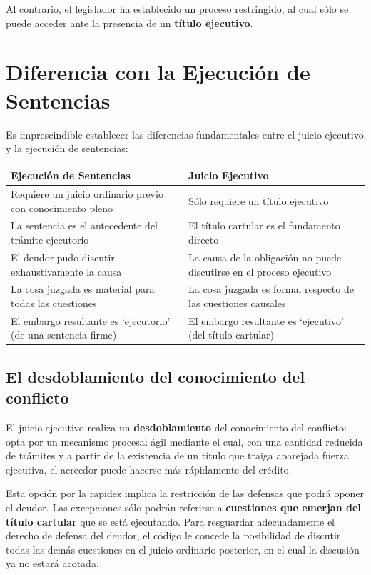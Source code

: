 \documentclass[12pt,oneside]{book}
\begin{document}
Al contrario, el legislador ha establecido un proceso restringido, al cual sólo se puede acceder ante la presencia de un \textbf{título ejecutivo}.

\section{Diferencia con la Ejecución de Sentencias}

Es imprescindible establecer las diferencias fundamentales entre el juicio ejecutivo y la ejecución de sentencias:

\begin{table}[H]
\centering
\begin{tabularx}{\textwidth}{Xp{5cm}}
\toprule
\textbf{Ejecución de Sentencias} & \textbf{Juicio Ejecutivo} \\
\midrule
Requiere un juicio ordinario previo con conocimiento pleno & Sólo requiere un título ejecutivo \\
\midrule
La sentencia es el antecedente del trámite ejecutorio & El título cartular es el fundamento directo \\
\midrule
El deudor pudo discutir exhaustivamente la causa & La causa de la obligación no puede discutirse en el proceso ejecutivo \\
\midrule
La cosa juzgada es material para todas las cuestiones & La cosa juzgada es formal respecto de las cuestiones causales \\
\midrule
El embargo resultante es `ejecutorio' (de una sentencia firme) & El embargo resultante es `ejecutivo' (del título cartular) \\
\bottomrule
\end{tabularx}
\end{table}

\subsection{El desdoblamiento del conocimiento del conflicto}

El juicio ejecutivo realiza un \textbf{desdoblamiento} del conocimiento del conflicto: opta por un mecanismo procesal ágil mediante el cual, con una cantidad reducida de trámites y a partir de la existencia de un título que traiga aparejada fuerza ejecutiva, el acreedor puede hacerse más rápidamente del crédito.

Esta opción por la rapidez implica la restricción de las defensas que podrá oponer el deudor. Las excepciones sólo podrán referirse a \textbf{cuestiones que emerjan del título cartular} que se está ejecutando. Para resguardar adecuadamente el derecho de defensa del deudor, el código le concede la posibilidad de discutir todas las demás cuestiones en el juicio ordinario posterior, en el cual la discusión ya no estará acotada.
\end{document}
